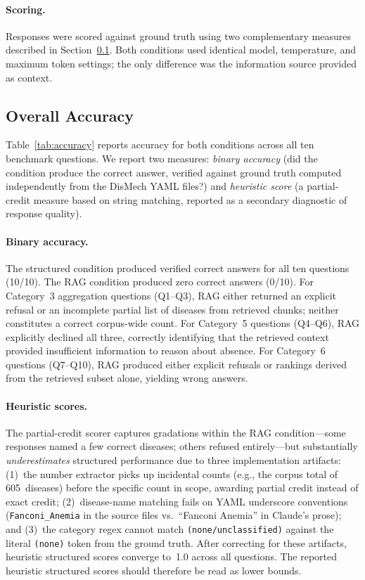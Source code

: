 \paragraph{Scoring.}
Responses were scored against ground truth using two complementary measures
described in Section~\ref{sec:results-overall}. Both conditions used identical
model, temperature, and maximum token settings; the only difference was the
information source provided as context.

\subsection{Overall Accuracy}
\label{sec:results-overall}

Table~\ref{tab:accuracy} reports accuracy for both conditions across all ten
benchmark questions. We report two measures: \emph{binary accuracy} (did the
condition produce the correct answer, verified against ground truth computed
independently from the DisMech YAML files?) and \emph{heuristic score} (a
partial-credit measure based on string matching, reported as a secondary
diagnostic of response quality).

\paragraph{Binary accuracy.}
The structured condition produced verified correct answers for all ten questions
(10/10). The RAG condition produced zero correct answers (0/10). For Category~3
aggregation questions (Q1--Q3), RAG either returned an explicit refusal or an
incomplete partial list of diseases from retrieved chunks; neither constitutes a
correct corpus-wide count. For Category~5 questions (Q4--Q6), RAG explicitly
declined all three, correctly identifying that the retrieved context provided
insufficient information to reason about absence. For Category~6 questions
(Q7--Q10), RAG produced either explicit refusals or rankings derived from the
retrieved subset alone, yielding wrong answers.

\paragraph{Heuristic scores.}
The partial-credit scorer captures gradations within the RAG condition---some
responses named a few correct diseases; others refused entirely---but
substantially \emph{underestimates} structured performance due to three
implementation artifacts: (1)~the number extractor picks up incidental counts
(e.g., the corpus total of 605~diseases) before the specific count in scope,
awarding partial credit instead of exact credit; (2)~disease-name matching
fails on YAML underscore conventions (\texttt{Fanconi\_Anemia} in the source
files vs.\ ``Fanconi Anemia'' in Claude's prose); and (3)~the category regex
cannot match \texttt{(none/unclassified)} against the literal \texttt{(none)}
token from the ground truth. After correcting for these artifacts, heuristic
structured scores converge to~1.0 across all questions. The reported heuristic
structured scores should therefore be read as lower bounds.

